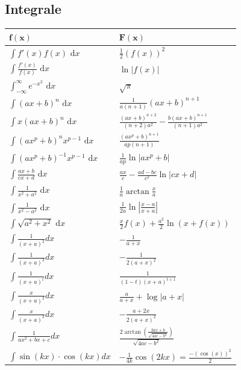 \documentclass[7pt,landscape, margin = 0.1mm]{article}
\def\dx{\text{ d}x}
\begin{document}
\begin{multicols}{4}
\begin{flushleft}
\subsection{Integrale}
\begin{center}
 \begin{tabularx}{\linewidth}{>{\centering\arraybackslash}X>{\centering\arraybackslash}X}
  \toprule
  $\mathbf{f(x)}$ & $\mathbf{F(x)}$ \\
  \midrule
  $\int f'(x) f(x) \dx$ & $\frac{1}{2}(f(x))^2$ \\
  $\int \frac{f'(x)}{f(x)} \dx$ & $\ln|f(x)|$ \\
  $\int_{-\infty}^\infty e^{-x^2} \dx$ & $\sqrt{\pi}$ \\
  $\int (ax+b)^n \dx$ & $\frac{1}{a(n+1)}(ax+b)^{n+1}$ \\
  $\int x(ax+b)^n \dx$ & $\frac{(ax+b)^{n+2}}{(n+2)a^2} - \frac{b(ax+b)^{n+1}}{(n+1)a^2}$ \\
  $\int (ax^p+b)^n x^{p-1} \dx$ & $\frac{(ax^p+b)^{n+1}}{ap(n+1)}$ \\
  $\int (ax^p + b)^{-1} x^{p-1} \dx$ & $\frac{1}{ap} \ln |ax^p + b|$ \\
  $\int \frac{ax+b}{cx+d} \dx$ & $\frac{ax}{c} - \frac{ad-bc}{c^2} \ln |cx +d|$ \\
  $\int \frac{1}{x^2+a^2} \dx$ & $\frac{1}{a} \arctan \frac{x}{a}$ \\
  $\int \frac{1}{x^2 - a^2} \dx$ & $\frac{1}{2a} \ln\left| \frac{x-a}{x+a} \right|$ \\
  $\int \sqrt{a^2+x^2} \dx $ & $\frac{x}{2}f(x) + \frac{a^2}{2}\ln(x+f(x))$ \\

   
   
   
  $\int \frac{1}{(x+a)^2}dx$& $-\frac{1}{a+x}$ \\
$\int \frac{1}{(x+a)^3}dx$& $-\frac{1}{2(a+x)^2}$ \\
$\int \frac{1}{(x+a)^t}dx$& $\frac{1}{(1-t)(x+a)^{t+1}}$ \\
$\int \frac{x}{(x+a)^2}dx$& $\frac{a}{a+x}+\log |a+x|$ \\
$\int \frac{x}{(x+a)^3}dx$& $-\frac{a+2x}{2(a+x)^2}$ \\
$\int \frac{1}{ax^2+bx+c}dx$& $\frac{2 \arctan\left(\frac{2ax+b}{\sqrt{4ac-b^2}} \right)}{\sqrt{4ac-b^2}}$\\

  $\int \sin(kx)\cdot \cos(kx)dx$ & $-\frac{1}{4k}\cos(2kx)=\frac{-(\cos(x))^2}{2}$\\
  



\end{tabularx}
\end{center}
\end{flushleft}
\end{multicols}
\end{document}
